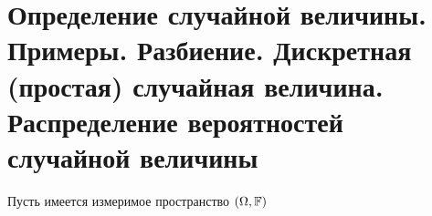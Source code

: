 \section{Определение случайной величины. Примеры. Разбиение. Дискретная (простая) случайная величина. Распределение вероятностей случайной величины}

Пусть имеется измеримое пространство $(\Omega, \mathbb{F})$